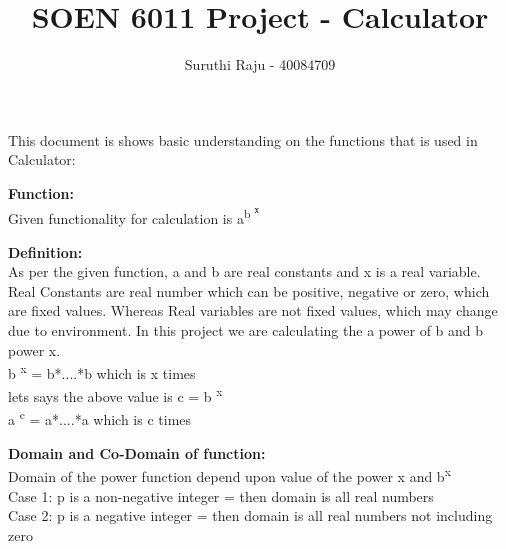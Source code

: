 \documentclass[a4paper,10pt]{article}
\title{SOEN 6011 Project - Calculator}
\author{Suruthi Raju - 40084709}
\date{}
\begin{document}
\maketitle

{\fontsize{12}{16}\selectfont This document is shows basic understanding on the functions that is used in Calculator: \\} 

{\Large\textbf{Function:}\\}
\newline
\indent\indent
{\fontsize{12}{16}\selectfont Given functionality for calculation is  a\textsuperscript{b \textsuperscript{x}}\\}

{\Large\textbf{Definition:}\\}
\newline
\indent\indent
{\fontsize{12}{16}\selectfont As per the given function, a and b are real constants and x is a real variable. Real Constants are real number which can be positive, negative or zero, which are fixed values. Whereas Real variables are not fixed values, which may change due to environment. In this project we are calculating the a power of b and b power x. \\}
\newline
\indent\indent
{\fontsize{12}{16}\selectfont b \textsuperscript{x} = b*....*b which is x times \\}
\newline
\indent\indent
{\fontsize{12}{16}\selectfont lets says the above value is c = b \textsuperscript{x} \\}
\newline
\indent\indent
{\fontsize{12}{16}\selectfont a \textsuperscript{c} = a*....*a which is c times \\}

{\Large\textbf{Domain and Co-Domain of function:} \\}
\newline
\indent\indent
{\fontsize{12}{16}\selectfont Domain of the power function depend upon value of the power x and b\textsuperscript{x} \\}
\newline
\indent\indent
{\fontsize{12}{16}\selectfont Case 1: p is a non-negative integer = then domain is all real numbers  \\ }
\newline
\indent\indent
{\fontsize{12}{16}\selectfont Case 2: p is a negative integer = then  domain is all real numbers not including zero  \\}
\end{document}
